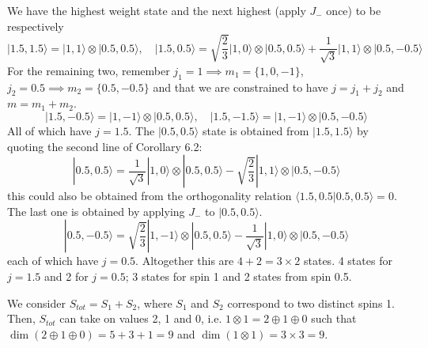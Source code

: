 \documentclass[a4paper]{article}
\begin{document}
\begin{eg}[$1\otimes0.5=1.5\oplus0.5$]
We have the highest weight state and the next highest (apply $J_-$ once) to be respectively
$$|1.5,1.5\rangle=|1,1\rangle\otimes|0.5,0.5\rangle,\quad|1.5,0.5\rangle=\sqrt{\frac{2}{3}}|1,0\rangle\otimes|0.5,0.5\rangle+\frac{1}{\sqrt{3}}|1,1\rangle\otimes|0.5,-0.5\rangle$$
For the remaining two, remember $j_1=1\implies m_1=\{1,0,-1\}$, $j_2=0.5\implies m_2=\{0.5,-0.5\}$ and that we are constrained to have $j=j_1+j_2$ and $m=m_1+m_2$.
$$|1.5,-0.5\rangle=|1,-1\rangle\otimes|0.5,0.5\rangle,\quad|1.5,-1.5\rangle=|1,-1\rangle\otimes|0.5,-0.5\rangle$$
All of which have $j=1.5$. The $|0.5,0.5\rangle$ state is obtained from $|1.5,1.5\rangle$ by quoting the second line of Corollary 6.2:
$$|0.5,0.5\rangle=\frac{1}{\sqrt{3}}|1,0\rangle\otimes|0.5,0.5\rangle-\sqrt{\frac{2}{3}}|1,1\rangle\otimes|0.5,-0.5\rangle$$
this could also be obtained from the orthogonality relation $\langle1.5,0.5|0.5,0.5\rangle=0$. The last one is obtained by applying $J_-$ to $|0.5,0.5\rangle$.
$$|0.5,-0.5\rangle=\sqrt{\frac{2}{3}}|1,-1\rangle\otimes|0.5,0.5\rangle-\frac{1}{\sqrt{3}}|1,0\rangle\otimes|0.5,-0.5\rangle$$
each of which have $j=0.5$. Altogether this are $4+2=3\times 2$ states. 4 states for $j=1.5$ and 2 for $j=0.5$; 3 states for spin 1 and 2 states from spin 0.5.
\end{eg}
\begin{eg}
We consider $S_{tot}=S_1+S_2$, where $S_1$ and $S_2$ correspond to two distinct spins 1. Then, $S_{tot}$ can take on values 2, 1 and 0, i.e. $1\otimes 1=2\oplus 1\oplus 0$ such that $\dim(2\oplus1\oplus0)=5+3+1=9$ and $\dim(1\otimes 1)=3\times 3=9$.
\end{eg}
\end{document}
